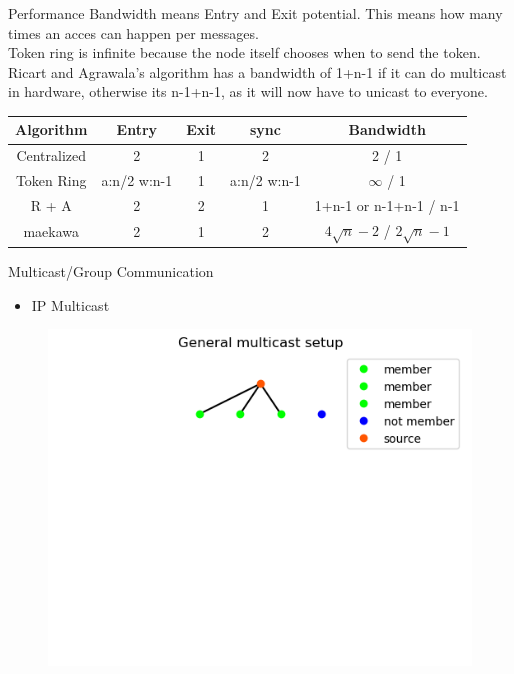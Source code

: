 \documentclass[aspectratio=1610,17pt,utf8]{beamer}
\begin{document}
\begin{frame}{Performance}
    Bandwidth means Entry and Exit potential. This means how many times an acces can happen per messages.\\
    Token ring is infinite because the node itself chooses when to send the token.\\
    Ricart and Agrawala's algorithm has a bandwidth of 1+n-1 if it can do multicast in hardware, otherwise its n-1+n-1, as it will now have to unicast to everyone.
    \tiny{\begin{table}
        \begin{tabular}{|c|c|c|c|c|}
            \hline
            Algorithm & Entry & Exit & sync & Bandwidth \\\hline
            Centralized & 2 & 1 & 2 & 2 / 1 \\\hline
            Token Ring & a:n/2 w:n-1 & 1 & a:n/2 w:n-1 & $\infty$ / 1 \\\hline
            R + A & 2 & 2 & 1 & 1+n-1 or n-1+n-1 / n-1 \\\hline
            maekawa & 2 & 1 & 2 & $4 \sqrt{n}-2$ / $2 \sqrt{n}-1$ \\\hline
        \end{tabular}
    \end{table}}
\end{frame}

\begin{frame}{Multicast/Group Communication}
    \begin{itemize}
        \item IP Multicast
    \end{itemize}

    \begin{figure}
        \includegraphics[width=.7\textwidth]{figures/2-multicast-group.png}
    \end{figure}
\end{frame}
\end{document}
